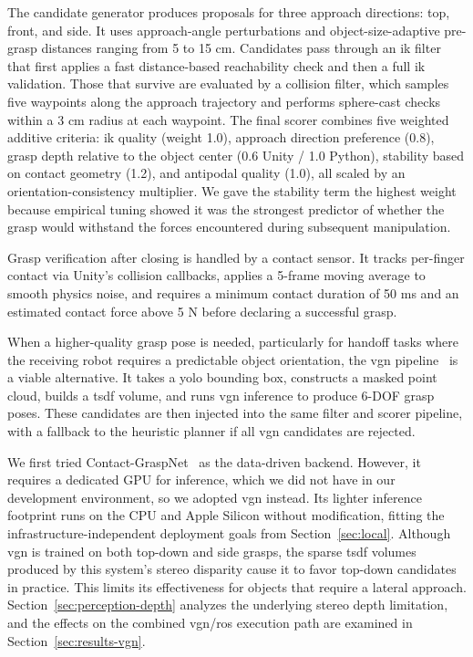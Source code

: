 \documentclass[
     12pt,
     a4paper,
     BCOR=10mm,
     DIV=14,
     listof=totoc,
     bibliography=totoc,
     parskip,
     twoside,
     headsepline
     ]{scrreprt}
\begin{document}
The candidate generator produces proposals for three approach directions: top, front, and side. It uses approach-angle perturbations and object-size-adaptive pre-grasp distances ranging from 5 to 15 cm. Candidates pass through an \gls{ik} filter that first applies a fast distance-based reachability check and then a full \gls{ik} validation. Those that survive are evaluated by a collision filter, which samples five waypoints along the approach trajectory and performs sphere-cast checks within a 3 cm radius at each waypoint. The final scorer combines five weighted additive criteria: \gls{ik} quality (weight 1.0), approach direction preference (0.8), grasp depth relative to the object center (0.6 Unity / 1.0 Python), stability based on contact geometry (1.2), and antipodal quality (1.0), all scaled by an orientation-consistency multiplier. We gave the stability term the highest weight because empirical tuning showed it was the strongest predictor of whether the grasp would withstand the forces encountered during subsequent manipulation.

Grasp verification after closing is handled by a contact sensor. It tracks per-finger contact via Unity's collision callbacks, applies a 5-frame moving average to smooth physics noise, and requires a minimum contact duration of 50 ms and an estimated contact force above 5 N before declaring a successful grasp.

When a higher-quality grasp pose is needed, particularly for handoff tasks where the receiving robot requires a predictable object orientation, the \gls{vgn} pipeline~\cite{breyer2021volumetricgraspingnetworkrealtime} is a viable alternative. It takes a \gls{yolo} bounding box, constructs a masked point cloud, builds a \gls{tsdf} volume, and runs \gls{vgn} inference to produce 6-DOF grasp poses. These candidates are then injected into the same filter and scorer pipeline, with a fallback to the heuristic planner if all \gls{vgn} candidates are rejected.

We first tried Contact-GraspNet~\cite{sundermeyer2021contactgraspnetefficient6dofgrasp} as the data-driven backend. However, it requires a dedicated GPU for inference, which we did not have in our development environment, so we adopted \gls{vgn} instead. Its lighter inference footprint runs on the CPU and Apple Silicon without modification, fitting the infrastructure-independent deployment goals from Section~\ref{sec:local}. Although \gls{vgn} is trained on both top-down and side grasps, the sparse \gls{tsdf} volumes produced by this system's stereo disparity cause it to favor top-down candidates in practice. This limits its effectiveness for objects that require a lateral approach. Section~\ref{sec:perception-depth} analyzes the underlying stereo depth limitation, and the effects on the combined \gls{vgn}/\gls{ros} execution path are examined in Section~\ref{sec:results-vgn}.
\end{document}
